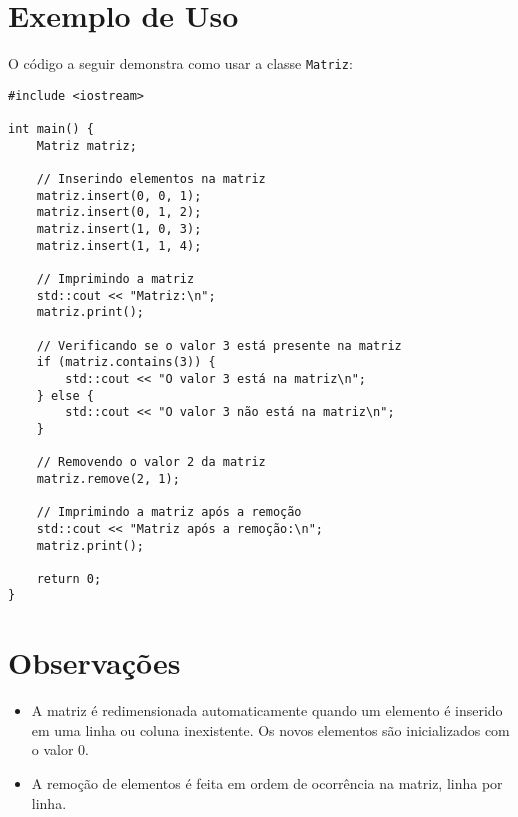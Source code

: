 \documentclass{article}
\begin{document}
\section{Exemplo de Uso}

O código a seguir demonstra como usar a classe \texttt{Matriz}:

\begin{verbatim}
#include <iostream>

int main() {
    Matriz matriz;

    // Inserindo elementos na matriz
    matriz.insert(0, 0, 1);
    matriz.insert(0, 1, 2);
    matriz.insert(1, 0, 3);
    matriz.insert(1, 1, 4);

    // Imprimindo a matriz
    std::cout << "Matriz:\n";
    matriz.print();

    // Verificando se o valor 3 está presente na matriz
    if (matriz.contains(3)) {
        std::cout << "O valor 3 está na matriz\n";
    } else {
        std::cout << "O valor 3 não está na matriz\n";
    }

    // Removendo o valor 2 da matriz
    matriz.remove(2, 1);

    // Imprimindo a matriz após a remoção
    std::cout << "Matriz após a remoção:\n";
    matriz.print();

    return 0;
}
\end{verbatim}

\section{Observações}

\begin{itemize}
    \item A matriz é redimensionada automaticamente quando um elemento é inserido em uma linha ou coluna inexistente. Os novos elementos são inicializados com o valor 0.
    \item A remoção de elementos é feita em ordem de ocorrência na matriz, linha por linha.
\end{itemize}
\end{document}

